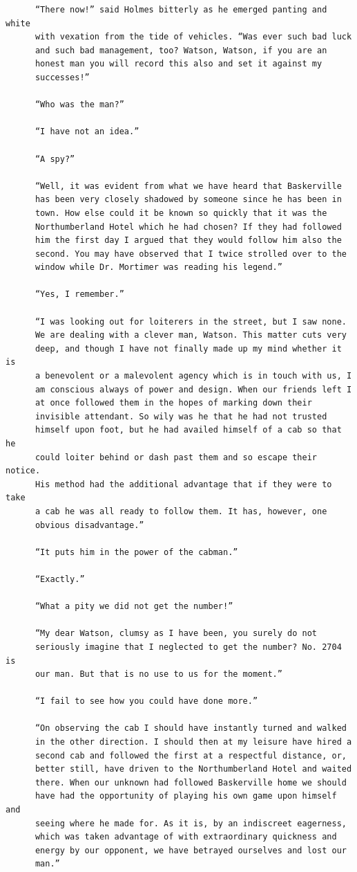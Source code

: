 \documentclass{article}
\begin{document}
\begin{verbatim}
      “There now!” said Holmes bitterly as he emerged panting and white
      with vexation from the tide of vehicles. “Was ever such bad luck
      and such bad management, too? Watson, Watson, if you are an
      honest man you will record this also and set it against my
      successes!”

      “Who was the man?”

      “I have not an idea.”

      “A spy?”

      “Well, it was evident from what we have heard that Baskerville
      has been very closely shadowed by someone since he has been in
      town. How else could it be known so quickly that it was the
      Northumberland Hotel which he had chosen? If they had followed
      him the first day I argued that they would follow him also the
      second. You may have observed that I twice strolled over to the
      window while Dr. Mortimer was reading his legend.”

      “Yes, I remember.”

      “I was looking out for loiterers in the street, but I saw none.
      We are dealing with a clever man, Watson. This matter cuts very
      deep, and though I have not finally made up my mind whether it is
      a benevolent or a malevolent agency which is in touch with us, I
      am conscious always of power and design. When our friends left I
      at once followed them in the hopes of marking down their
      invisible attendant. So wily was he that he had not trusted
      himself upon foot, but he had availed himself of a cab so that he
      could loiter behind or dash past them and so escape their notice.
      His method had the additional advantage that if they were to take
      a cab he was all ready to follow them. It has, however, one
      obvious disadvantage.”

      “It puts him in the power of the cabman.”

      “Exactly.”

      “What a pity we did not get the number!”

      “My dear Watson, clumsy as I have been, you surely do not
      seriously imagine that I neglected to get the number? No. 2704 is
      our man. But that is no use to us for the moment.”

      “I fail to see how you could have done more.”

      “On observing the cab I should have instantly turned and walked
      in the other direction. I should then at my leisure have hired a
      second cab and followed the first at a respectful distance, or,
      better still, have driven to the Northumberland Hotel and waited
      there. When our unknown had followed Baskerville home we should
      have had the opportunity of playing his own game upon himself and
      seeing where he made for. As it is, by an indiscreet eagerness,
      which was taken advantage of with extraordinary quickness and
      energy by our opponent, we have betrayed ourselves and lost our
      man.”


\end{verbatim}
\end{document}

